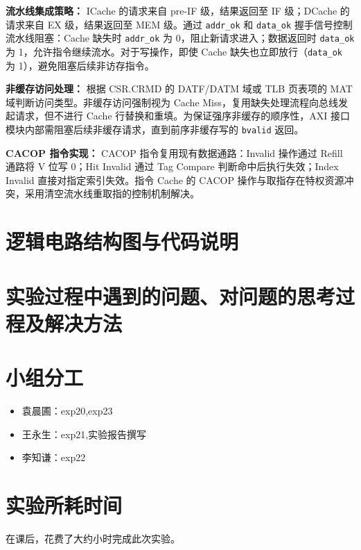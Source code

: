 \documentclass[11pt]{article}
\begin{document}
\textbf{流水线集成策略：}
ICache 的请求来自 pre-IF 级，结果返回至 IF 级；DCache 的请求来自 EX 级，结果返回至 MEM 级。通过 \verb|addr_ok| 和 \verb|data_ok| 握手信号控制流水线阻塞：Cache 缺失时 \verb|addr_ok| 为 0，阻止新请求进入；数据返回时 \verb|data_ok| 为 1，允许指令继续流水。对于写操作，即使 Cache 缺失也立即放行（\verb|data_ok| 为 1），避免阻塞后续非访存指令。

\textbf{非缓存访问处理：}
根据 CSR.CRMD 的 DATF/DATM 域或 TLB 页表项的 MAT 域判断访问类型。非缓存访问强制视为 Cache Miss，复用缺失处理流程向总线发起请求，但不进行 Cache 行替换和重填。为保证强序非缓存的顺序性，AXI 接口模块内部需阻塞后续非缓存请求，直到前序非缓存写的 \verb|bvalid| 返回。

\textbf{CACOP 指令实现：}
CACOP 指令复用现有数据通路：Invalid 操作通过 Refill 通路将 V 位写 0；Hit Invalid 通过 Tag Compare 判断命中后执行失效；Index Invalid 直接对指定索引失效。指令 Cache 的 CACOP 操作与取指存在特权资源冲突，采用清空流水线重取指的控制机制解决。

\section{逻辑电路结构图与代码说明}









\section{实验过程中遇到的问题、对问题的思考过程及解决方法}









\section{小组分工}

\begin{itemize}
    \item 袁晨圃：exp20,exp23
    \item 王永生：exp21,实验报告撰写
    \item 李知谦：exp22
\end{itemize}

\section{实验所耗时间}

\newcommand{\labTime}{23}

在课后，花费了大约\underline{\makebox[5em][c]{\labTime}}小时完成此次实验。
\end{document}
